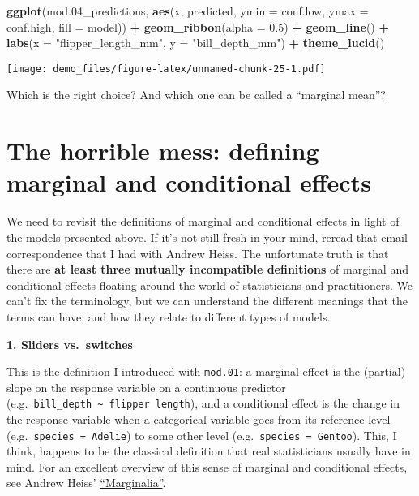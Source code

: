 \documentclass[
]{article}
\newenvironment{Shaded}{\begin{snugshade}}{\end{snugshade}}
\newcommand{\AttributeTok}[1]{\textcolor[rgb]{0.13,0.29,0.53}{#1}}
\newcommand{\FloatTok}[1]{\textcolor[rgb]{0.00,0.00,0.81}{#1}}
\newcommand{\FunctionTok}[1]{\textcolor[rgb]{0.13,0.29,0.53}{\textbf{#1}}}
\newcommand{\NormalTok}[1]{#1}
\newcommand{\SpecialCharTok}[1]{\textcolor[rgb]{0.81,0.36,0.00}{\textbf{#1}}}
\newcommand{\StringTok}[1]{\textcolor[rgb]{0.31,0.60,0.02}{#1}}
\begin{document}
\begin{Shaded}
\begin{Highlighting}[]
\FunctionTok{ggplot}\NormalTok{(mod}\FloatTok{.04}\NormalTok{\_predictions, }\FunctionTok{aes}\NormalTok{(x, predicted, }
                               \AttributeTok{ymin =}\NormalTok{ conf.low, }
                               \AttributeTok{ymax =}\NormalTok{ conf.high,}
                               \AttributeTok{fill =}\NormalTok{ model)) }\SpecialCharTok{+}
  \FunctionTok{geom\_ribbon}\NormalTok{(}\AttributeTok{alpha =} \FloatTok{0.5}\NormalTok{) }\SpecialCharTok{+}
  \FunctionTok{geom\_line}\NormalTok{() }\SpecialCharTok{+}
  \FunctionTok{labs}\NormalTok{(}\AttributeTok{x =} \StringTok{"flipper\_length\_mm"}\NormalTok{, }\AttributeTok{y =} \StringTok{"bill\_depth\_mm"}\NormalTok{) }\SpecialCharTok{+}
  \FunctionTok{theme\_lucid}\NormalTok{()}
\end{Highlighting}
\end{Shaded}

\texttt{[image: demo\_files/figure-latex/unnamed-chunk-25-1.pdf]}

Which is the right choice? And which one can be called a ``marginal
mean''?

\hypertarget{the-horrible-mess-defining-marginal-and-conditional-effects}{%
\section{The horrible mess: defining marginal and conditional
effects}\label{the-horrible-mess-defining-marginal-and-conditional-effects}}

We need to revisit the definitions of marginal and conditional effects
in light of the models presented above. If it's not still fresh in your
mind, reread that email correspondence that I had with Andrew Heiss. The
unfortunate truth is that there are \textbf{at least three mutually
incompatible definitions} of marginal and conditional effects floating
around the world of statisticians and practitioners. We can't fix the
terminology, but we can understand the different meanings that the terms
can have, and how they relate to different types of models.

\textbf{1. Sliders vs.~switches}

This is the definition I introduced with \texttt{mod.01}: a marginal
effect is the (partial) slope on the response variable on a continuous
predictor
(e.g.~\texttt{bill\_depth\ \textasciitilde{}\ flipper\ length}), and a
conditional effect is the change in the response variable when a
categorical variable goes from its reference level
(e.g.~\texttt{species\ =\ Adelie}) to some other level
(e.g.~\texttt{species\ =\ Gentoo}). This, I think, happens to be the
classical definition that real statisticians usually have in mind. For
an excellent overview of this sense of marginal and conditional effects,
see Andrew Heiss'
\href{https://www.andrewheiss.com/blog/2022/05/20/marginalia/}{``Marginalia''}.
\end{document}
